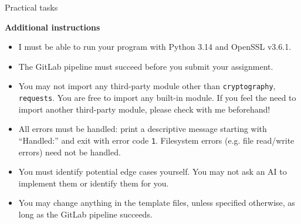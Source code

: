 \documentclass{homework}
\begin{document}
\begin{center}
  Practical tasks
\end{center}

\textbf{Additional instructions}

\begin{itemize}
  \item I must be able to run your program with Python 3.14 and OpenSSL v3.6.1\footnotemark{}.
  \item The GitLab pipeline must succeed before you submit your assignment.
  \item You may not import any third-party module other than \texttt{cryptography}, \texttt{requests}.
  You are free to import any built-in module.
  If you feel the need to import another third-party module, please check with me beforehand!
  \item All errors must be handled: print a descriptive message starting with \enquote{Handled:} and exit with error code \texttt{1}.
  Filesystem errors (e.g. file read/write errors) need not be handled.
  \item You must identify potential edge cases yourself.
  You may not ask an AI to implement them or identify them for you.
  \item You may change anything in the template files, unless specified otherwise, as long as the GitLab pipeline succeeds.
\end{itemize}
\end{document}
